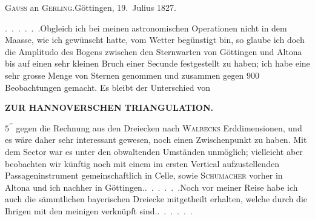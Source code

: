 \begin{center}
\textsc{Gauss} an \textsc{Gerling}.\quad Göttingen, 19.~Julius 1827.
\end{center}

\par\noindent\hspace*{\parindent}\mbox{.\ .\ .\ .\ .\ .}\quad Obgleich ich bei meinen astronomischen Operationen nicht in
dem Maasse, wie ich gewünscht hatte, vom Wetter begünstigt bin, so glaube
ich doch die Amplitudo des Bogens zwischen den Sternwarten von Göttingen
und Altona bis auf einen sehr kleinen Bruch einer Secunde festgestellt zu
haben; ich habe eine sehr grosse Menge von Sternen genommen und
zusammen gegen 900 Beobachtungen gemacht. Es bleibt der Unterschied von
\par\clearpage
\noindent\null\hfill{\small\textbf{ZUR HANNOVERSCHEN TRIANGULATION.}}\hfill{}\par\medskip
\noindent \(5^{\prime\prime}\) gegen die Rechnung aus den Dreiecken nach \textsc{Walbecks} Erddimensionen,
und es wäre daher sehr interessant gewesen, noch einen Zwischenpunkt zu
haben. Mit dem Sector war es unter den obwaltenden Umständen unmöglich;
vielleicht aber beobachten wir künftig noch mit einem im ersten Vertical
aufzustellenden Passageninstrument gemeinschaftlich in Celle, sowie \textsc{Schumacher}
vorher in Altona und ich nachher in \mbox{Göttingen.\quad\mbox{.\ .\ .\ .\ .\ .}}\quad Noch vor meiner
Reise habe ich auch die sämmtlichen bayerischen Dreiecke mitgetheilt
erhalten, welche durch die Ihrigen mit den meinigen verknüpft \mbox{sind.\quad\mbox{.\ .\ .\ .\ .\ .}}
\par
